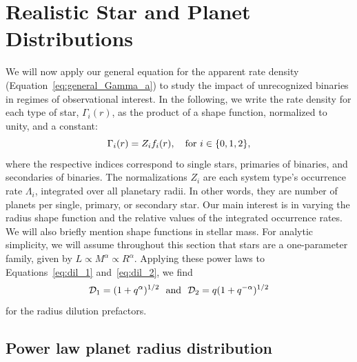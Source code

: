 \documentclass[12pt,modern]{aastex61}
\begin{document}

\section{Realistic Star and Planet Distributions}
\label{sec:more_complicated}

We will now apply our general equation for the apparent rate density
(Equation~\ref{eq:general_Gamma_a}) to study the impact of
unrecognized binaries in regimes of observational interest.  In the
following, we write the rate density for each type of star,
$\Gamma_i(r)$, as the product of a shape function, normalized to
unity, and a constant:
\begin{equation}
    \Gamma_i(r) = Z_i f_i(r), \quad {\rm for\ }i\in\{0,1,2\},
\end{equation}
where the respective indices correspond to single stars, primaries of
binaries, and secondaries of binaries.  The normalizations $Z_i$ are
each system type's occurrence rate $\Lambda_i$, integrated over all
planetary radii. In other words, they are number of planets per
single, primary, or secondary star.  Our main interest is in
varying the radius shape function and the relative values of the
integrated occurrence rates. We will also briefly mention shape
functions in stellar mass.  For analytic simplicity, we will assume
throughout this section that stars are a one-parameter family, given
by $L \propto M^\alpha \propto R^\alpha$.  Applying these power laws
to Equations~\ref{eq:dil_1} and~\ref{eq:dil_2}, we find
\begin{equation}
  \mathcal{D}_1
  =  (1+q^\alpha)^{1/2}~~{\rm and}~~\mathcal{D}_2
  = q(1+q^{-\alpha})^{1/2}
\end{equation}
for the radius dilution prefactors.


\subsection{Power law planet radius distribution}
\label{sec:model_2}
\end{document}
